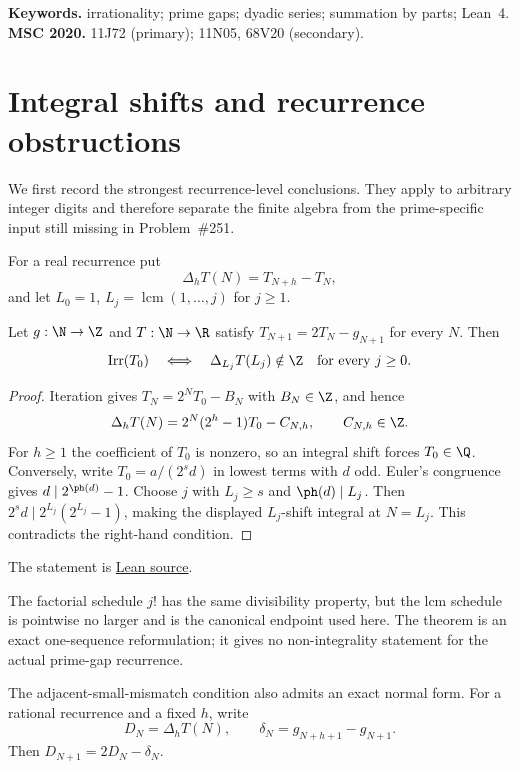\documentclass[11pt]{article}
\begin{document}
\medskip
\noindent\textbf{Keywords.} irrationality; prime gaps; dyadic series;
summation by parts; Lean~4.
\qquad\textbf{MSC 2020.} 11J72 (primary); 11N05, 68V20 (secondary).

\section{Integral shifts and recurrence obstructions}\label{sec:diagonal-collapse}

We first record the strongest recurrence-level conclusions.  They apply to
arbitrary integer digits and therefore separate the finite algebra from the
prime-specific input still missing in Problem~\#251.

For a real recurrence put
\[
 \Delta_hT(N)=T_{N+h}-T_N,
\]
and let $L_0=1$, $L_j=\operatorname{lcm}(1,\ldots,j)$ for $j\ge1$.

\begin{theorem}\label{res:lcmdiagonal}
Let $g:\N\to\Z$ and $T:\N\to\R$ satisfy
$T_{N+1}=2T_N-g_{N+1}$ for every $N$.  Then
\[
 \operatorname{Irr}(T_0)
 \quad\Longleftrightarrow\quad
 \Delta_{L_j}T(L_j)\notin\Z
 \quad\hbox{for every }j\ge0.
\]
\end{theorem}

\begin{proof}
Iteration gives $T_N=2^NT_0-B_N$ with $B_N\in\Z$, and hence
\[
 \Delta_hT(N)=2^N(2^h-1)T_0-C_{N,h},\qquad C_{N,h}\in\Z.
\]
For $h\ge1$ the coefficient of $T_0$ is nonzero, so an integral shift
forces $T_0\in\Q$.  Conversely, write
$T_0=a/(2^sd)$ in lowest terms with $d$ odd.  Euler's congruence gives
$d\mid2^{\ph(d)}-1$.  Choose $j$ with $L_j\ge s$ and $\ph(d)\mid L_j$.
Then $2^s d\mid2^{L_j}(2^{L_j}-1)$, making the displayed $L_j$-shift
integral at $N=L_j$.  This contradicts the right-hand condition.
\end{proof}

\noindent The statement is \href{https://github.com/wcook04/plectis-erdos/blob/f36a98bf3d3e6f65f1074e3b800e3293d5b8a51a/ErdosProblems/Erdos251/OrderLatticeDiagonal.lean#L153}{Lean source}.

The factorial schedule $j!$ has the same divisibility property, but the lcm
schedule is pointwise no larger and is the canonical endpoint used here.  The
theorem is an exact one-sequence reformulation; it gives no non-integrality
statement for the actual prime-gap recurrence.

The adjacent-small-mismatch condition also admits an exact normal form.  For a
rational recurrence and a fixed $h$, write
\[
 D_N=\Delta_hT(N),\qquad
 \delta_N=g_{N+h+1}-g_{N+1}.
\]
Then $D_{N+1}=2D_N-\delta_N$.
\end{document}
